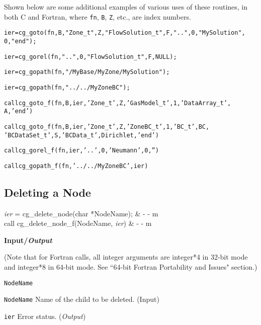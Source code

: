 Shown below are some additional examples of various uses of these
routines, in both C and Fortran, where \texttt{fn}, \texttt{B},
\texttt{Z}, etc., are index numbers.

\begin{alltt}
   ier = cg\_goto(fn, B, "Zone\_t", Z, "FlowSolution\_t", F, "..", 0, "MySolution",
                 0, "end");

   ier = cg\_gorel(fn, "..", 0, "FlowSolution\_t", F, NULL);

   ier = cg\_gopath(fn, "/MyBase/MyZone/MySolution");

   ier = cg\_gopath(fn, "../../MyZoneBC");

   call cg\_goto\_f(fn, B, ier, 'Zone\_t', Z, 'GasModel\_t', 1, 'DataArray\_t',
                  A, 'end')

   call cg\_goto\_f(fn, B, ier, 'Zone\_t', Z, 'ZoneBC\_t', 1, 'BC\_t', BC,
                  'BCDataSet\_t', S, 'BCData\_t', Dirichlet, 'end')

   call cg\_gorel\_f(fn, ier, '..', 0, 'Neumann', 0, '')

   call cg\_gopath\_f(fn, '../../MyZoneBC', ier)
\end{alltt}

\subsection{Deleting a Node}
\label{s:delete}

\begin{fctbox}
\textcolor{output}{\textit{ier}} = cg\_delete\_node(\textcolor{input}{char *NodeName}); & - - m \\
\hline
call cg\_delete\_node\_f(\textcolor{input}{NodeName}, \textcolor{output}{\textit{ier}}) & - - m \\
\end{fctbox}

\noindent
\textbf{\textcolor{input}{Input}/\textcolor{output}{\textit{Output}}}

\noindent (Note that for Fortran calls, all integer arguments are integer*4 in 32-bit mode and integer*8 in 64-bit mode.
See ``64-bit Fortran Portability and Issues" section.)

\begin{Ventryi}{\texttt{NodeName}}\raggedright
\item [\texttt{NodeName}]
      Name of the child to be deleted.
      (\textcolor{input}{Input})
\item [\texttt{ier}]
      Error status.
      (\textcolor{output}{\textit{Output}})
\end{Ventryi}

